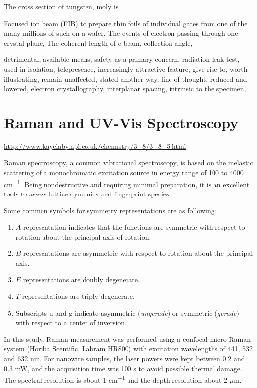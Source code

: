  
The cross section of tungsten, moly is 

Focused ion beam (FIB) to prepare thin foils of individual gates from one of the many millions of such on a wafer. The events of electron passing through one crystal plane, The coherent length of e-beam, collection angle, 

detrimental, available means, safety as a primary concern, radiation-leak test, used in isolation, telepresence, increasingly attractive feature, give rise to, worth illustrating, remain unaffected, stated another way, line of thought, reduced and lowered, electron crystallography, interplanar spacing, intrinsic to the specimen, 

\section{Raman and UV-Vis Spectroscopy}

\url{http://www.kayelaby.npl.co.uk/chemistry/3_8/3_8_5.html}

Raman spectroscopy, a common vibrational spectroscopy, is based on the inelastic scattering of a monochromatic excitation source in energy range of 100 to 4000 \si{cm^{-1}}. Being nondestructive and requiring minimal preparation, 
it is an excellent tools to assess lattice dynamics and fingerprint species.\cite{McCreery2000} 

Some common symbols for symmetry representations are as following:
\begin{enumerate}
\item $A$ representation indicates that the functions are symmetric with respect to rotation about the principal axis of rotation.
\item $B$ representations are asymmetric with respect to rotation about the principal axis.
\item $E$ representations are doubly degenerate.
\item $T$ representations are triply degenerate.
\item Subscripts u and g indicate asymmetric (\emph{ungerade}) or symmetric (\emph{gerade}) with respect to a center of inversion.
\end{enumerate}

In this study, Raman measurement was performed using a confocal micro-Raman system (Horiba Scentific, Labram HR800) with excitation wavelengths of 441, 532 and 632 nm. For nanowire samples, the laser powers were kept between 0.2 and 0.3 mW, and the acquisition time was 100 s to avoid possible thermal damage. The spectral resolution is about 1 \si{cm^{-1}} and the depth resolution about 2 $\mu$m.  

